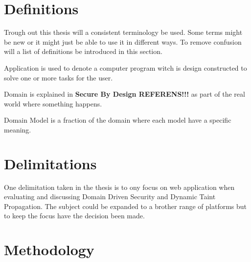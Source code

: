 \section{Definitions}
Trough out this thesis will a consistent terminology be used. Some terms might be new or it might just be able to use it in different ways. To remove confusion will a list of definitions be introduced in this section.

\begin{definition}{Application} 
	is used to denote a computer program witch is design constructed to solve one or more tasks for the user.
\end{definition}

\begin{definition}{Domain}
	is explained in \textbf{Secure By Design REFERENS!!!} as part of the real world where something happens.
\end{definition}

\begin{definition}{Domain Model}
	is a fraction of the domain where each model have a specific meaning.
\end{definition}


\section{Delimitations}
One delimitation taken in the thesis is to ony focus on web application when evaluating and discussing Domain Driven Security and Dynamic Taint Propagation. The subject could be expanded to a brother range of platforms but to keep the focus have the decision been made.


\section{Methodology}
